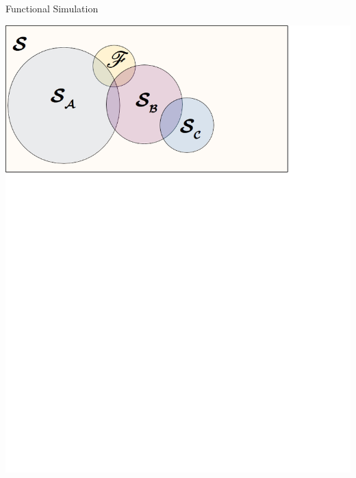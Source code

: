 \documentclass{beamer}
\begin{document}
\begin{frame}{Functional Simulation}
\begin{center}
\includegraphics[scale=0.55]{Images/sd5.png}
\end{center}
\end{frame}
\end{document}
